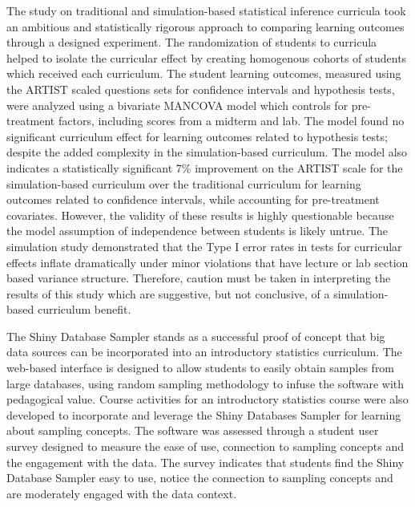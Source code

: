 \documentclass[11pt]{isuthesis}\usepackage[]{graphicx}\usepackage[]{color}
\newcommand{\km}[1]{{\color{red} #1}}
\begin{document}
\km{The study on traditional and simulation-based statistical inference curricula took an ambitious and statistically rigorous approach to comparing learning outcomes through a designed experiment. The randomization of students to curricula helped to isolate the curricular effect by creating homogenous cohorts of students which received each curriculum. The student learning outcomes, measured using the ARTIST scaled questions sets for confidence intervals and hypothesis tests, were analyzed using a bivariate MANCOVA model which controls for pre-treatment factors, including scores from a midterm and lab. The model found no significant curriculum effect for learning outcomes related to hypothesis tests; despite the added complexity in the simulation-based curriculum. The model also indicates a statistically significant 7\% improvement on the ARTIST scale for the simulation-based curriculum over the traditional curriculum for learning outcomes related to confidence intervals, while accounting for pre-treatment covariates. However, the validity of these results is highly questionable because the model assumption of independence between students is likely untrue. The simulation study demonstrated that the Type I error rates in tests for curricular effects inflate dramatically under minor violations that have lecture or lab section based variance structure. Therefore, caution must be taken in interpreting the results of this study which are suggestive, but not conclusive, of a simulation-based curriculum benefit.}

The Shiny Database Sampler stands as a successful proof of concept that big data sources can be incorporated into an introductory statistics curriculum. The web-based interface is designed to allow students to easily obtain samples from large databases, using random sampling methodology to infuse the software with pedagogical value. Course activities for an introductory statistics course were also developed to incorporate and leverage the Shiny Databases Sampler for learning about sampling concepts. The software was assessed through a student user survey designed to measure the ease of use, connection to sampling concepts and the engagement with the data. The survey indicates that students find the Shiny Database Sampler easy to use, notice the connection to sampling concepts and are moderately engaged with the data context.
\end{document}
